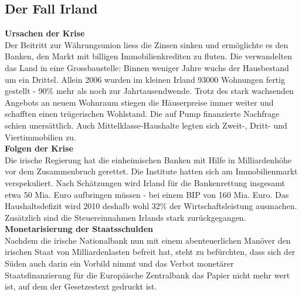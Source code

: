 \subsection{Der Fall Irland}
\textbf{Ursachen der Krise}\\
Der Beitritt zur Währungsunion liess die Zinsen sinken und ermöglichte es den Banken, den Markt mit billigen Immobilienkrediten zu fluten. Die verwandelten das Land in eine Grossbaustelle: Binnen weniger Jahre wuchs der Hausbestand um ein Drittel. Allein 2006 wurden im kleinen Irland 93000 Wohnungen fertig gestellt - 90\% mehr als noch zur Jahrtausendwende. Trotz des stark wachsenden Angebots an neuem Wohnraum stiegen die Häuserpreise immer weiter und schafften einen trügerischen Wohlstand. Die auf Pump finanzierte Nachfrage schien unersättlich. Auch Mittelklasse-Haushalte legten sich Zweit-, Dritt- und Viertimmobilien zu.\\
\textbf{Folgen der Krise}\\
Die irische Regierung hat die einheimischen Banken mit Hilfe in Milliardenhöhe vor dem Zusammenbruch gerettet. Die Institute hatten sich am Immobilienmarkt verspekuliert. Nach Schätzungen wird Irland für die Bankenrettung insgesamt etwa 50 Mia. Euro aufbringen müssen - bei einem BIP von 160 Mia. Euro. Das Haushaltsdefizit wird 2010 deshalb wohl 32\% der Wirtschaftsleistung ausmachen. Zusätzlich sind die Steuereinnahmen Irlands stark zurückgegangen.\\
\textbf{Monetarisierung der Staatsschulden}\\
Nachdem die irische Nationalbank nun mit einem abenteuerlichen Manöver den irischen Staat von Milliardenlasten befreit hat, steht zu befürchten, dass sich der Süden auch darin ein Vorbild nimmt und das Verbot monetärer Staatsfinanzierung für die Europäische Zentralbank das Papier nicht mehr wert ist, auf dem der Gesetzestext gedruckt ist.
